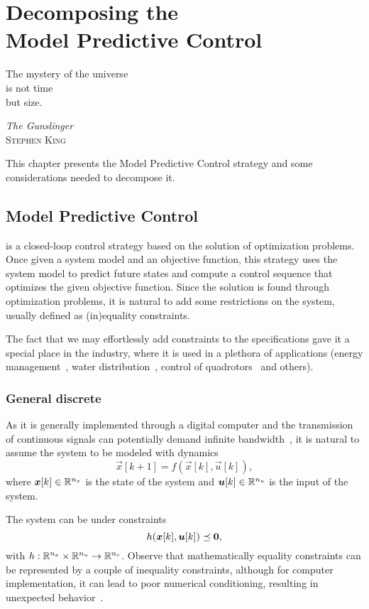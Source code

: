 \documentclass[../main.tex]{subfiles}
\begin{document}
\chapter[Decomposing the Model Predictive Control]{Decomposing the\\ Model Predictive Control}\label{sec:decomposing_mpc}
\epigraph{\centering The mystery of the universe \\ is not time \\but size.}
{\textit{The Gunslinger}\\\textsc{Stephen King}}

This chapter presents the Model Predictive Control strategy and some considerations needed to decompose it.

\minitoc

\section{Model Predictive Control}
\mpclong{} is a closed-loop control strategy based
on the solution of optimization problems.
Once given a system model and an objective function, this strategy uses the system model to predict future states and compute a control sequence that optimizes the given objective function.
Since the solution is found through optimization problems, it is natural to add some restrictions on the system, usually defined as (in)equality constraints.

The fact that we may effortlessly add constraints to the specifications gave it a special place in the industry, where it is used in a plethora of applications (energy management~\cite{AnandutaEtAl2018}, water distribution~\cite{ZhangEtAl2021}, control of quadrotors~\cite{BanguraMahony2014} and others).

\subsection{General discrete \mpc{}}
As it is generally implemented through a digital computer and the transmission of continuous signals can potentially demand infinite bandwidth~\cite{HeEtAl2022}, it is natural to assume the system to be modeled with \dt{} dynamics
\begin{equation}
\vec{x}[k+1]=f(\vec{x}[k],\vec{u}[k]),
\end{equation}
where $\boldsymbol{x}[k]\in\mathbb{R}^{n_{x}}$ is the state of the system and $\boldsymbol{u}[k]\in\mathbb{R}^{n_{u}}$ is the input of the system.

The system can be under constraints
\begin{equation}
 h(\boldsymbol{x}[k],\boldsymbol{u}[k])\preceq\mathbf{0},
\end{equation}
with ${h:\mathbb{R}^{n_{x}}\times\mathbb{R}^{n_{u}}\to\mathbb{R}^{n_{c}}}$.
Observe that mathematically equality constraints can be represented by a couple of inequality constraints, although for computer implementation, it can lead to poor numerical conditioning, resulting in unexpected behavior~\cite{BorrelliEtAl2017}.
\end{document}
